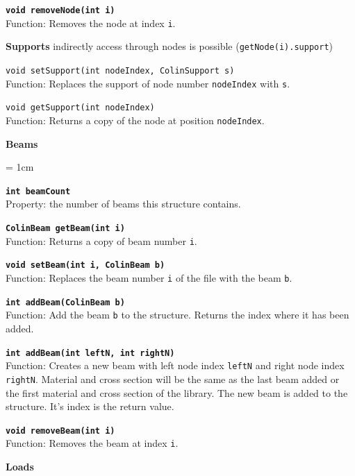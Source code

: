 \begin{trivlist}
\begin{trivlist}
		\item[] \textbf{\texttt{void removeNode(int i)}}\\ Function: Removes the node at index \texttt{i}.
	\end{trivlist}
	\item[]\textbf{Supports} indirectly access through nodes is possible (\texttt{getNode(i).support})
	\begin{trivlist}
		\leftskip=1cm
		\item[] \texttt{void setSupport(int nodeIndex, ColinSupport s)}\\ Function: Replaces the support of node number \texttt{nodeIndex} with \texttt{s}.
		\item[] \texttt{void getSupport(int nodeIndex)}\\ Function: Returns a copy of the node at position \texttt{nodeIndex}.
	\end{trivlist}
	\item[]\textbf{Beams}
		\begin{trivlist}
		\leftskip = 1cm
		\item[] \textbf{\texttt{int beamCount}}\\ Property: the number of beams this structure contains. 
		\item[] \textbf{\texttt{ColinBeam getBeam(int i)}}\\ Function: Returns a copy of beam number \texttt{i}.
		\item[] \textbf{\texttt{void setBeam(int i, ColinBeam b)}}\\ Function: Replaces the beam number \texttt{i} of the file with the beam \texttt{b}.
		\item[] \textbf{\texttt{int addBeam(ColinBeam b)}}\\ Function: Add the beam \texttt{b} to the structure. Returns the index where it has been added.
		\item[] \textbf{\texttt{int addBeam(int leftN, int rightN)}}\\ Function: Creates a new beam with left node index \texttt{leftN} and right node index \texttt{rightN}. Material and cross section will be the same as the last beam added or the first material and cross section of the library. The new beam is added to the structure. It's index is the return value.
		\item[] \textbf{\texttt{void removeBeam(int i)}}\\ Function: Removes the beam at index \texttt{i}.
	\end{trivlist}
	\item[]\textbf{Loads}

\end{trivlist}
